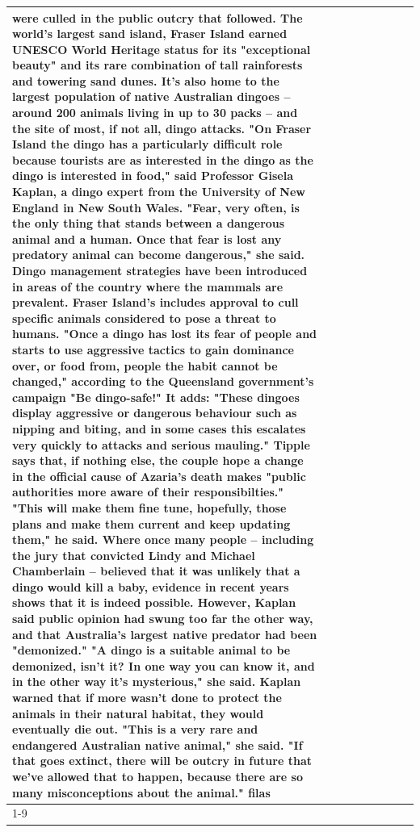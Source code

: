\begin{table}[H]
\begin{tabular}{lllrlllll}
were culled in the public outcry that followed. The world's largest sand island, Fraser Island earned UNESCO World Heritage status for its "exceptional beauty" and its rare combination of tall rainforests and towering sand dunes. It's also home to the largest population of native Australian dingoes -- around 200 animals living in up to 30 packs -- and the site of most, if not all, dingo attacks. "On Fraser Island the dingo has a particularly difficult role because tourists are as interested in the dingo as the dingo is interested in food," said Professor Gisela Kaplan, a dingo expert from the University of New England in New South Wales. "Fear, very often, is the only thing that stands between a dangerous animal and a human. Once that fear is lost any predatory animal can become dangerous," she said. Dingo management strategies have been introduced in areas of the country where the mammals are prevalent. Fraser Island's includes approval to cull specific animals considered to pose a threat to humans. "Once a dingo has lost its fear of people and starts to use aggressive tactics to gain dominance over, or food from, people the habit cannot be changed," according to the Queensland government's campaign "Be dingo-safe!" It adds: "These dingoes display aggressive or dangerous behaviour such as nipping and biting, and in some cases this escalates very quickly to attacks and serious mauling." Tipple says that, if nothing else, the couple hope a change in the official cause of Azaria's death makes "public authorities more aware of their responsibilties." "This will make them fine tune, hopefully, those plans and make them current and keep updating them," he said. Where once many people -- including the jury that convicted Lindy and Michael Chamberlain -- believed that it was unlikely that a dingo would kill a baby, evidence in recent years shows that it is indeed possible. However, Kaplan said public opinion had swung too far the other way, and that Australia's largest native predator had been "demonized." "A dingo is a suitable animal to be demonized, isn't it? In one way you can know it, and in the other way it's mysterious," she said. Kaplan warned that if more wasn't done to protect the animals in their natural habitat, they would eventually die out. "This is a very rare and endangered Australian native animal," she said. "If that goes extinct, there will be outcry in future that we've allowed that to happen, because there are so many misconceptions about the animal." filas \\
\cline{1-9}

\end{tabular}
\end{table}
